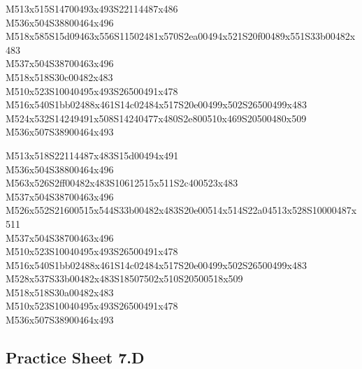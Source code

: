 \documentclass{article}
\begin{document}
\begin{multicols}{5}
\begin{center}
M513x515S14700493x493S22114487x486 %
\\M536x504S38800464x496 %
\\M518x585S15d09463x556S11502481x570S2ea00494x521S20f00489x551S33b00482x483 %
\\M537x504S38700463x496 %
\\M518x518S30c00482x483 %
\\M510x523S10040495x493S26500491x478 %
\\M516x540S1bb02488x461S14c02484x517S20e00499x502S26500499x483 %
\\M524x532S14249491x508S14240477x480S2e800510x469S20500480x509 %
\\M536x507S38900464x493 %
\vfil
\columnbreak

M513x518S22114487x483S15d00494x491 %
\\M536x504S38800464x496 %
\\M563x526S2ff00482x483S10612515x511S2c400523x483 %
\\M537x504S38700463x496 %
\\M526x552S21600515x544S33b00482x483S20e00514x514S22a04513x528S10000487x511 %
\\M537x504S38700463x496 %
\\M510x523S10040495x493S26500491x478 %
\\M516x540S1bb02488x461S14c02484x517S20e00499x502S26500499x483 %
\\M528x537S33b00482x483S18507502x510S20500518x509 %
\\M518x518S30a00482x483 %
\\M510x523S10040495x493S26500491x478 %
\\M536x507S38900464x493 %
\vfil

\end{center}
\end{multicols}

\subsection{Practice Sheet 7.D}
\end{document}
